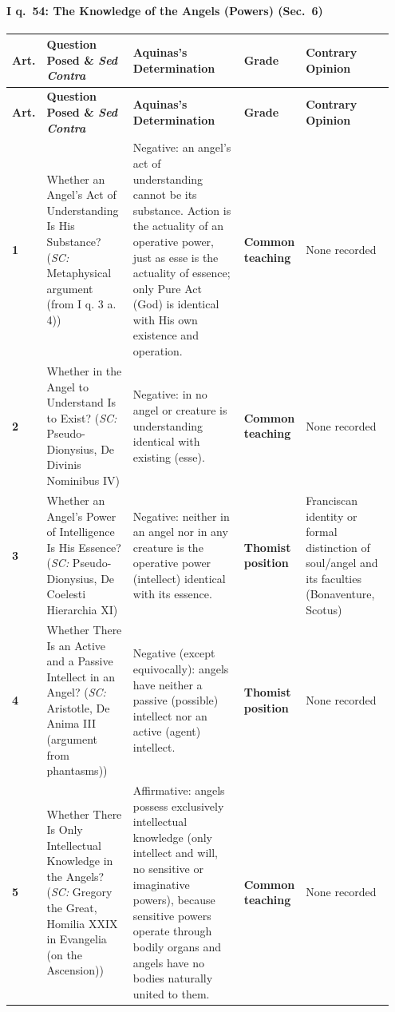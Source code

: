 \paragraph{I q.~54: The Knowledge of the Angels (Powers) (Sec.~6)}
{\scriptsize
\setlength{\tabcolsep}{2.5pt}
\renewcommand{\arraystretch}{1.15}
\begin{longtable}{>{\raggedright\arraybackslash}p{0.05\linewidth}>{\raggedright\arraybackslash}p{0.23\linewidth}>{\raggedright\arraybackslash}p{0.31\linewidth}>{\raggedright\arraybackslash}p{0.12\linewidth}>{\raggedright\arraybackslash}p{0.24\linewidth}}
\toprule
\textbf{Art.} & \textbf{Question Posed \& \emph{Sed Contra}} & \textbf{Aquinas's Determination} & \textbf{Grade} & \textbf{Contrary Opinion} \\
\midrule
\endfirsthead
\toprule
\textbf{Art.} & \textbf{Question Posed \& \emph{Sed Contra}} & \textbf{Aquinas's Determination} & \textbf{Grade} & \textbf{Contrary Opinion} \\
\midrule
\endhead
\bottomrule
\endfoot
\textbf{1} & Whether an Angel's Act of Understanding Is His Substance? (\emph{SC:} Metaphysical argument (from I q. 3 a. 4)) & Negative: an angel's act of understanding cannot be its substance. Action is the actuality of an operative power, just as esse is the actuality of essence; only Pure Act (God) is identical with His own existence and operation. & \textbf{Common teaching} & None recorded \\
\addlinespace[1.5pt]
\textbf{2} & Whether in the Angel to Understand Is to Exist? (\emph{SC:} Pseudo-Dionysius, De Divinis Nominibus IV) & Negative: in no angel or creature is understanding identical with existing (esse). & \textbf{Common teaching} & None recorded \\
\addlinespace[1.5pt]
\textbf{3} & Whether an Angel's Power of Intelligence Is His Essence? (\emph{SC:} Pseudo-Dionysius, De Coelesti Hierarchia XI) & Negative: neither in an angel nor in any creature is the operative power (intellect) identical with its essence. & \textbf{Thomist position} & Franciscan identity or formal distinction of soul/angel and its faculties (Bonaventure, Scotus) \\
\addlinespace[1.5pt]
\textbf{4} & Whether There Is an Active and a Passive Intellect in an Angel? (\emph{SC:} Aristotle, De Anima III (argument from phantasms)) & Negative (except equivocally): angels have neither a passive (possible) intellect nor an active (agent) intellect. & \textbf{Thomist position} & None recorded \\
\addlinespace[1.5pt]
\textbf{5} & Whether There Is Only Intellectual Knowledge in the Angels? (\emph{SC:} Gregory the Great, Homilia XXIX in Evangelia (on the Ascension)) & Affirmative: angels possess exclusively intellectual knowledge (only intellect and will, no sensitive or imaginative powers), because sensitive powers operate through bodily organs and angels have no bodies naturally united to them. & \textbf{Common teaching} & None recorded \\
\end{longtable}
}


